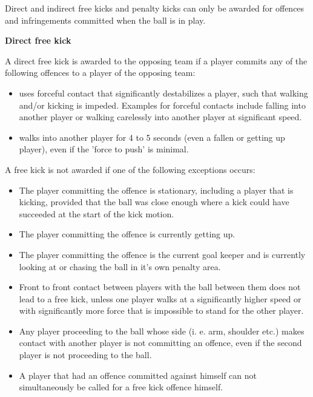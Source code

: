 \clearpage
\sffamily
{\bfseries\color[rgb]{0.4,0.4,0.4}{Law 12 -- Fouls and Misconduct} }
{}

\bigskip

Direct and indirect free kicks and penalty kicks can only be awarded for
offences and infringements committed when the ball is in play.

\bigskip

{\bfseries Direct free kick }

\headlinebox

A direct free kick is awarded to the opposing team if a player commits any of the following offences to a player of the opposing team:
\begin{itemize}
\item uses forceful contact that significantly destabilizes a player, such that walking and/or kicking is impeded. Examples for forceful contacts include falling into another player or walking carelessly into another player at significant speed.
\item walks into another player for 4 to 5 seconds (even a fallen or getting up player), even if the 'force to push' is minimal.
\end{itemize}

A free kick is not awarded if one of the following exceptions occurs: 
\begin{itemize}
\item The player committing the offence is stationary, including a player that is kicking, provided that the ball was close enough where a kick could have succeeded at the start of the kick motion.
\item The player committing the offence is currently getting up.
\item The player committing the offence is the current goal keeper and is currently looking at or chasing the ball in it's own penalty area.
\item Front to front contact between players with the ball between them does not lead to a free kick, unless one player walks at a significantly higher speed or with significantly more force that is impossible to stand for the other player.
\item Any player proceeding to the ball whose side (i. e. arm, shoulder etc.)  makes contact with another player is not committing an offence, even if the second player is not proceeding to the ball.
\item A player that had an offence committed against himself can not simultaneously be called for a free kick offence himself.
\end{itemize}



